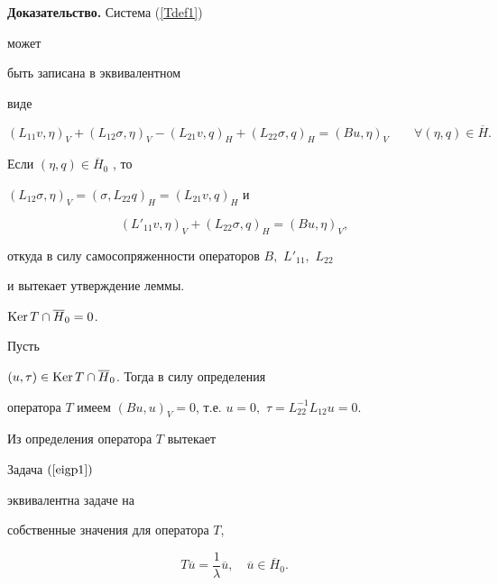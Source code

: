 {\bf Доказательство.} Система (\ref{Tdef1}) 


может 


быть записана в эквивалентном


виде


$$


(L_{11}v, \eta )_V + (L_{12} \sigma, \eta)_V


- (L_{21}v, q )_H + (L_{22} \sigma, q)_H = (Bu, \eta )_V


\qquad \forall (\eta , q) \in \overline H. 


$$


Если $(\eta , q) \in \overline H_0 $ , то


$ (L_{12} \sigma, \eta)_V = (\sigma, L_{22}q)_H = (L_{21}v,


q)_H $ и


$$


(L'_{11}v, \eta )_V + (L_{22} \sigma, q)_H = (Bu, \eta )_V,


$$


откуда в силу самосопряженности операторов $ B,$ $L'_{11},$ $L_{22} $


и вытекает утверждение леммы.





\begin{lem}


 $ \operatorname{Ker} T \cap \overline H_0 = 0 $. 


\end{lem}





\begin{pf} Пусть


$ (u, \tau) \in \operatorname{Ker} T \cap \overline H_0 $. Тогда в силу определения


оператора $ T $ имеем $(Bu, u)_V = 0 $, т.е. $ u = 0,$ $\tau =


L_{22}^{-1}L_{12}u = 0 $. \end{pf}





Из определения оператора $T$ вытекает


\begin{lem}


Задача $(\ref{eigp1})$


эквивалентна задаче на 


собственные значения для оператора $T$,


$$


T\overline u = \frac 1 \lambda \overline u, \quad \overline u \in \overline H_0.


$$


\end{lem} 





